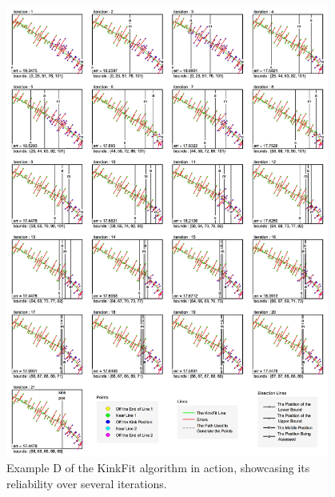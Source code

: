\begin{figure}[h!]
  \centering
    \includegraphics[width=0.95\textwidth]{Chapter4/Figs/KinkFit_K.jpg}
    \caption{Example D of the KinkFit algorithm in action, showcasing its reliability over several iterations.}\label{fig:KinkFitK}
\end{figure}



